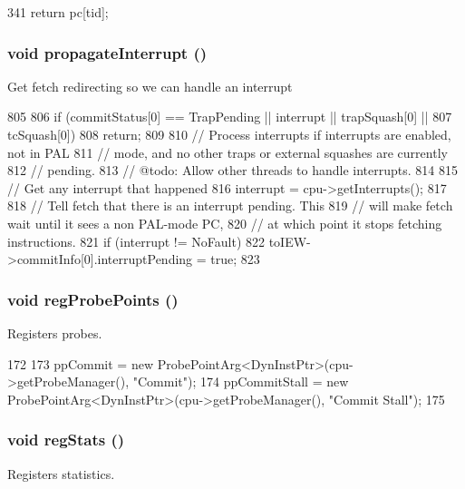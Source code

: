 \begin{DoxyCode}
341 { return pc[tid]; }
\end{DoxyCode}
\hypertarget{classDefaultCommit_ab9d20a05498697dfc59478b80a0726fb}{
\subsubsection[{propagateInterrupt}]{\setlength{\rightskip}{0pt plus 5cm}void propagateInterrupt ()}}
\label{classDefaultCommit_ab9d20a05498697dfc59478b80a0726fb}
Get fetch redirecting so we can handle an interrupt 


\begin{DoxyCode}
805 {
806     if (commitStatus[0] == TrapPending || interrupt || trapSquash[0] ||
807             tcSquash[0])
808         return;
809 
810     // Process interrupts if interrupts are enabled, not in PAL
811     // mode, and no other traps or external squashes are currently
812     // pending.
813     // @todo: Allow other threads to handle interrupts.
814 
815     // Get any interrupt that happened
816     interrupt = cpu->getInterrupts();
817 
818     // Tell fetch that there is an interrupt pending.  This
819     // will make fetch wait until it sees a non PAL-mode PC,
820     // at which point it stops fetching instructions.
821     if (interrupt != NoFault)
822         toIEW->commitInfo[0].interruptPending = true;
823 }
\end{DoxyCode}
\hypertarget{classDefaultCommit_aa2dab17a363fd4307274d579796adcf7}{
\subsubsection[{regProbePoints}]{\setlength{\rightskip}{0pt plus 5cm}void regProbePoints ()}}
\label{classDefaultCommit_aa2dab17a363fd4307274d579796adcf7}
Registers probes. 


\begin{DoxyCode}
172 {
173     ppCommit = new ProbePointArg<DynInstPtr>(cpu->getProbeManager(), "Commit");
174     ppCommitStall = new ProbePointArg<DynInstPtr>(cpu->getProbeManager(), "Commit
      Stall");
175 }
\end{DoxyCode}
\hypertarget{classDefaultCommit_a4dc637449366fcdfc4e764cdf12d9b11}{
\subsubsection[{regStats}]{\setlength{\rightskip}{0pt plus 5cm}void regStats ()}}
\label{classDefaultCommit_a4dc637449366fcdfc4e764cdf12d9b11}
Registers statistics. 


